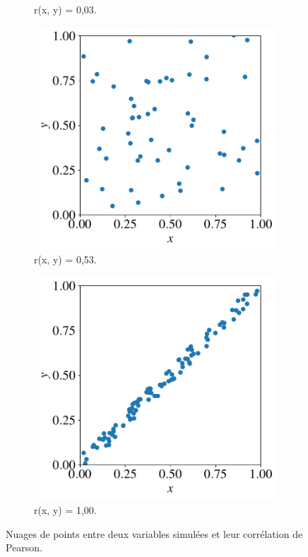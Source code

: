 \begin{figure}[h]
\begin{subfigure}[t]{0.24\textwidth}
		\caption{r(x, y) = 0,03.}
	\end{subfigure} \hfill
	\begin{subfigure}[t]{0.24\textwidth}
		\centering
		\includegraphics[width=\textwidth]{figures/stats/pearson_2}
		\caption{r(x, y) = 0,53.}
	\end{subfigure} \hfill
	\begin{subfigure}[t]{0.24\textwidth}
		\centering
		\includegraphics[width=\textwidth]{figures/stats/pearson_1}
		\caption{r(x, y) = 1,00.}
	\end{subfigure} \hfill
	\caption{Nuages de points entre deux variables simulées et leur corrélation de Pearson.}
	\label{fig:pearson}
\end{figure}

